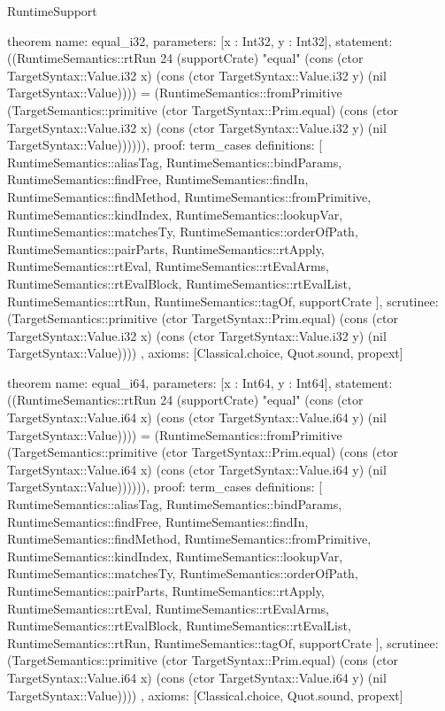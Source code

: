 \begin{lexlean}{RuntimeSupport}
\begin{semanticmodule}
theorem{
  name: equal_i32,
  parameters: [x : Int32, y : Int32],
  statement: ((RuntimeSemantics::rtRun 24 (supportCrate) "equal" (cons (ctor TargetSyntax::Value.i32 x) (cons (ctor TargetSyntax::Value.i32 y) (nil TargetSyntax::Value)))) = (RuntimeSemantics::fromPrimitive (TargetSemantics::primitive (ctor TargetSyntax::Prim.equal) (cons (ctor TargetSyntax::Value.i32 x) (cons (ctor TargetSyntax::Value.i32 y) (nil TargetSyntax::Value)))))),
  proof: term_cases{
    definitions: [
      RuntimeSemantics::aliasTag,
      RuntimeSemantics::bindParams,
      RuntimeSemantics::findFree,
      RuntimeSemantics::findIn,
      RuntimeSemantics::findMethod,
      RuntimeSemantics::fromPrimitive,
      RuntimeSemantics::kindIndex,
      RuntimeSemantics::lookupVar,
      RuntimeSemantics::matchesTy,
      RuntimeSemantics::orderOfPath,
      RuntimeSemantics::pairParts,
      RuntimeSemantics::rtApply,
      RuntimeSemantics::rtEval,
      RuntimeSemantics::rtEvalArms,
      RuntimeSemantics::rtEvalBlock,
      RuntimeSemantics::rtEvalList,
      RuntimeSemantics::rtRun,
      RuntimeSemantics::tagOf,
      supportCrate
    ],
    scrutinee: (TargetSemantics::primitive (ctor TargetSyntax::Prim.equal) (cons (ctor TargetSyntax::Value.i32 x) (cons (ctor TargetSyntax::Value.i32 y) (nil TargetSyntax::Value))))
  },
  axioms: [Classical.choice, Quot.sound, propext]
}

theorem{
  name: equal_i64,
  parameters: [x : Int64, y : Int64],
  statement: ((RuntimeSemantics::rtRun 24 (supportCrate) "equal" (cons (ctor TargetSyntax::Value.i64 x) (cons (ctor TargetSyntax::Value.i64 y) (nil TargetSyntax::Value)))) = (RuntimeSemantics::fromPrimitive (TargetSemantics::primitive (ctor TargetSyntax::Prim.equal) (cons (ctor TargetSyntax::Value.i64 x) (cons (ctor TargetSyntax::Value.i64 y) (nil TargetSyntax::Value)))))),
  proof: term_cases{
    definitions: [
      RuntimeSemantics::aliasTag,
      RuntimeSemantics::bindParams,
      RuntimeSemantics::findFree,
      RuntimeSemantics::findIn,
      RuntimeSemantics::findMethod,
      RuntimeSemantics::fromPrimitive,
      RuntimeSemantics::kindIndex,
      RuntimeSemantics::lookupVar,
      RuntimeSemantics::matchesTy,
      RuntimeSemantics::orderOfPath,
      RuntimeSemantics::pairParts,
      RuntimeSemantics::rtApply,
      RuntimeSemantics::rtEval,
      RuntimeSemantics::rtEvalArms,
      RuntimeSemantics::rtEvalBlock,
      RuntimeSemantics::rtEvalList,
      RuntimeSemantics::rtRun,
      RuntimeSemantics::tagOf,
      supportCrate
    ],
    scrutinee: (TargetSemantics::primitive (ctor TargetSyntax::Prim.equal) (cons (ctor TargetSyntax::Value.i64 x) (cons (ctor TargetSyntax::Value.i64 y) (nil TargetSyntax::Value))))
  },
  axioms: [Classical.choice, Quot.sound, propext]
}


\end{semanticmodule}
\end{lexlean}
